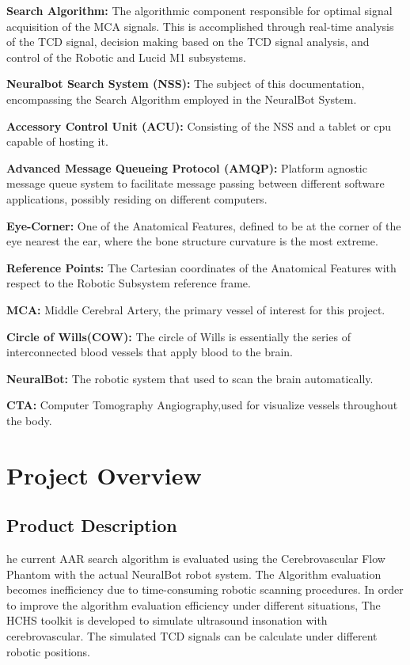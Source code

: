 \documentclass[10pt]{article}
\begin{document}
  \textbf{Search Algorithm:} The algorithmic component responsible for
  optimal signal acquisition of the MCA signals.  This is accomplished
  through real-time analysis of the TCD signal, decision making based
  on the TCD signal analysis, and control of the Robotic and Lucid M1
  subsystems.

  \textbf{Neuralbot Search System (NSS):} The subject of this
  documentation, encompassing the Search Algorithm employed in the
  NeuralBot System.


  \textbf{Accessory Control Unit (ACU):} Consisting of the NSS and a
  tablet or cpu capable of hosting it.

  \textbf{Advanced Message Queueing Protocol (AMQP):} Platform
  agnostic message queue system to facilitate message passing between
  different software applications, possibly residing on different
  computers.

  \textbf{Eye-Corner:} One of the Anatomical Features, defined to be
  at the corner of the eye nearest the ear, where the bone structure
  curvature is the most extreme.

  \textbf{Reference Points:} The Cartesian coordinates of the
  Anatomical Features with respect to the Robotic Subsystem reference
  frame.
  
  \textbf{MCA:} Middle Cerebral Artery, the primary vessel of interest
  for this project.
  
  \textbf{Circle of Wills(COW):} The circle of Wills is essentially the series of interconnected blood vessels that apply blood to the brain.

  \textbf{NeuralBot:} The robotic system that used to scan the brain automatically.
  
  \textbf{CTA:} Computer Tomography Angiography,used for visualize vessels throughout the body.
  
\section{Project Overview}
 \subsection{Product  Description}
  he current AAR search algorithm is evaluated using the Cerebrovascular Flow Phantom with the actual NeuralBot robot system. The Algorithm evaluation becomes inefficiency due to time-consuming robotic scanning procedures. In order to improve the algorithm evaluation efficiency under different situations, The HCHS toolkit is developed to simulate ultrasound insonation with cerebrovascular. The simulated TCD signals can be calculate under different robotic positions. 
  
\end{document}
